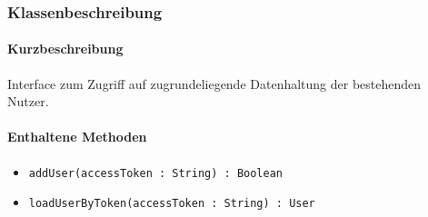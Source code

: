 \subsubsection*{Klassenbeschreibung}%
\paragraph*{Kurzbeschreibung}
Interface zum Zugriff auf zugrundeliegende Datenhaltung der bestehenden Nutzer.
\paragraph*{Enthaltene Methoden}
\begin{itemize}
    \item \texttt{addUser(accessToken : String) : Boolean}
    \item \texttt{loadUserByToken(accessToken : String) : User}
\end{itemize}
